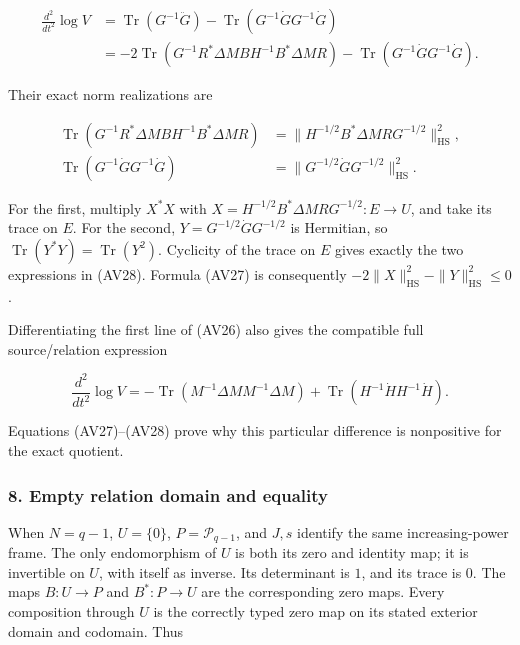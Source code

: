 \[
\begin{aligned}
\frac{d^2}{dt^2}\log V
&=\operatorname{Tr}(G^{-1}\ddot G)
-\operatorname{Tr}(G^{-1}\dot G G^{-1}\dot G)\\
&=-2\operatorname{Tr}(G^{-1}R^*\Delta M BH^{-1}B^*\Delta M R)
-\operatorname{Tr}(G^{-1}\dot G G^{-1}\dot G).
\end{aligned}
\tag{AV27}
\]

Their exact norm realizations are

\[
\begin{aligned}
\operatorname{Tr}(G^{-1}R^*\Delta M BH^{-1}B^*\Delta M R)
&=\|H^{-1/2}B^*\Delta M RG^{-1/2}\|_{\mathrm{HS}}^2,\\
\operatorname{Tr}(G^{-1}\dot G G^{-1}\dot G)
&=\|G^{-1/2}\dot G G^{-1/2}\|_{\mathrm{HS}}^2.
\end{aligned}
\tag{AV28}
\]

For the first, multiply \(X^*X\) with \(X=H^{-1/2}B^*\Delta M RG^{-1/2}:E\to U\), and take its trace on \(E\). For the second, \(Y=G^{-1/2}\dot G G^{-1/2}\) is Hermitian, so \(\operatorname{Tr}(Y^*Y)=\operatorname{Tr}(Y^2)\). Cyclicity of the trace on \(E\) gives exactly the two expressions in (AV28). Formula (AV27) is consequently \(-2\|X\|_{\mathrm{HS}}^2-\|Y\|_{\mathrm{HS}}^2\le0\).

Differentiating the first line of (AV26) also gives the compatible full source/relation expression

\[
\frac{d^2}{dt^2}\log V
=-\operatorname{Tr}(M^{-1}\Delta M M^{-1}\Delta M)
+\operatorname{Tr}(H^{-1}\dot H H^{-1}\dot H).
\tag{AV29}
\]

Equations (AV27)--(AV28) prove why this particular difference is nonpositive for the exact quotient.

\subsubsection{8. Empty relation domain and equality}\label{endpoint-variation_review--empty-relation-domain-and-equality}

When \(N=q-1\), \(U=\{0\}\), \(P=\mathcal P_{q-1}\), and \(J,s\) identify the same increasing-power frame. The only endomorphism of \(U\) is both its zero and identity map; it is invertible on \(U\), with itself as inverse. Its determinant is \(1\), and its trace is \(0\). The maps \(B:U\to P\) and \(B^*:P\to U\) are the corresponding zero maps. Every composition through \(U\) is the correctly typed zero map on its stated exterior domain and codomain. Thus

